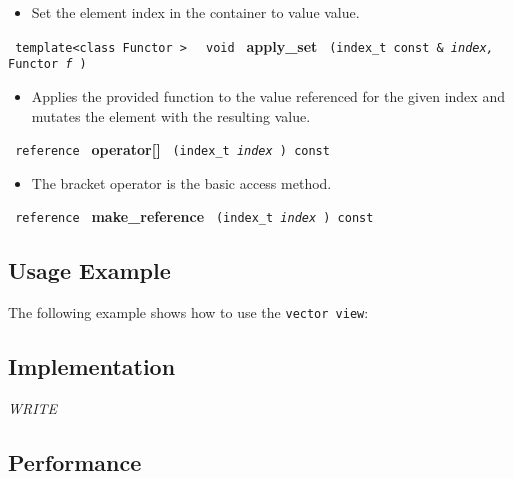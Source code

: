 \begin{itemize}
\item
Set the element index in the container to value value.
\end{itemize}

\noindent
\texttt{%
template<class Functor >
}
\texttt{%
void
}
\newline
\textbf{apply\_set}%
\texttt{%
(index\_t const \&
\textit{index,}%
Functor
\textit{f}%
)
}

\begin{itemize}
\item
Applies the provided function to the value referenced for the given index and mutates the element with the resulting value.
\end{itemize}

\noindent
\texttt{%
reference
}
\newline
\textbf{operator[]}%
\texttt{%
(index\_t
\textit{index}%
) const
}

\begin{itemize}
\item
The bracket operator is the basic access method.
\end{itemize}

\noindent
\texttt{%
reference
}
\newline
\textbf{make\_reference}%
\texttt{%
(index\_t
\textit{index}%
) const
}

\subsection{Usage Example} \label{sec-vec-vw-use}

The following example shows how to use the \texttt{vector view}:


\subsection{Implementation} \label{sec-vec-vw-impl}

\textit{WRITE}

\subsection{Performance} \label{sec-vec-vw-perf}

